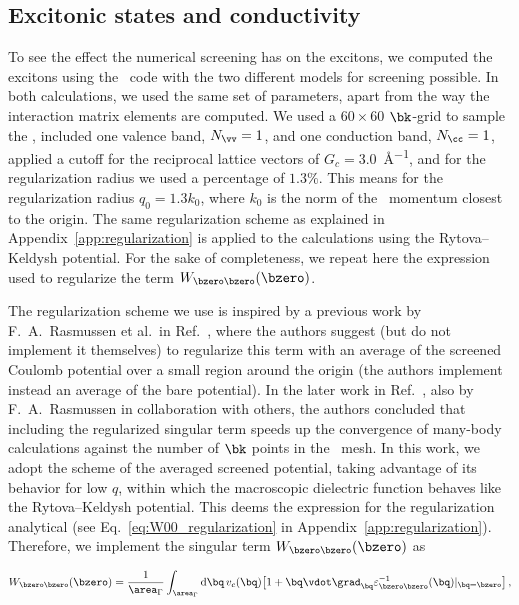 \subsection{Excitonic states and conductivity}
\label{subsec:excitons_results}

To see the effect the numerical screening has on the excitons, we computed the excitons using the \xatu~code with the two different models for screening possible.
In both calculations, we used the same set of parameters, apart from the way the interaction matrix elements are computed.
We used a $60\times60$ $\bk$-grid to sample the \bz, included one valence band, $N_{\vv}=1$, and one conduction band, $N_{\cc}=1$, applied a cutoff for the reciprocal lattice vectors of $G_c = 3.0$~\unit{\angstrom^{-1}}, and for the regularization radius we used a percentage of $1.3\%$.
This means for the regularization radius $q_0 = 1.3 k_0$, where $k_0$ is the norm of the \bz~momentum closest to the origin.
The same regularization scheme as explained in Appendix~\ref{app:regularization} is applied to the calculations using the Rytova--Keldysh potential.
For the sake of completeness, we repeat here the expression used to regularize the term $W_{\bzero \bzero} (\bzero)$.

The regularization scheme we use is inspired by a previous work by F.~A.~Rasmussen et al.~in Ref.~\cite{Rasmussen_Schmidt_Winther_Thygesen_2016}, where the authors suggest (but do not implement it themselves) to regularize this term with an average of the screened Coulomb potential over a small region around the origin (the authors implement instead an average of the bare potential).
In the later work in Ref.~\cite{Rasmussen_Schmidt_Winther_Thygesen_2016}, also by F.~A.~Rasmussen in collaboration with others, the authors concluded that including the regularized singular term speeds up the convergence of many-body calculations against the number of $\bk$ points in the \bz~mesh.
In this work, we adopt the scheme of the averaged screened potential, taking advantage of its behavior for low $q$, within which the macroscopic dielectric function behaves like the Rytova--Keldysh potential.
This deems the expression for the regularization analytical (see Eq.~\eqref{eq:W00_regularization} in Appendix~\ref{app:regularization}).
Therefore, we implement the singular term $W_{\bzero \bzero} (\bzero)$ as

\begin{equation}
    W_{\bzero \bzero} (\bzero) = \frac{1}{\area_{\Gamma}} \int_{\area_{\Gamma}} \mathrm{d} \bq \, v_c(\bq) \big[1 + \bq \vdot \mathbf{\grad}_{\bq} \varepsilon^{-1}_{\bzero \bzero} (\bq)|_{\bq = \bzero} \big] \,,
\end{equation}

